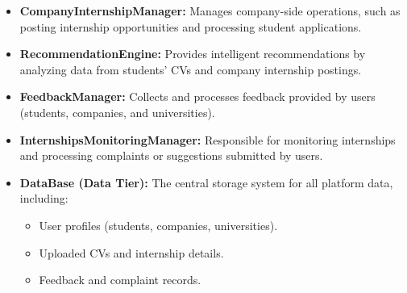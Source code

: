 \begin{itemize}
    \item \textbf{CompanyInternshipManager:}
    Manages company-side operations, such as posting internship opportunities and processing student applications.

    \item \textbf{RecommendationEngine:}
    Provides intelligent recommendations by analyzing data from students’ CVs and company internship postings.

    \item \textbf{FeedbackManager:}
    Collects and processes feedback provided by users (students, companies, and universities).

    \item \textbf{InternshipsMonitoringManager:}
    Responsible for monitoring internships and processing complaints or suggestions submitted by users.

    \item \textbf{DataBase (Data Tier):}
    The central storage system for all platform data, including:
    \begin{itemize}
        \item User profiles (students, companies, universities).
        \item Uploaded CVs and internship details.
        \item Feedback and complaint records.
    \end{itemize}
\end{itemize}


